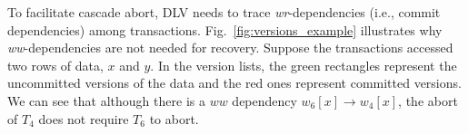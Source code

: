 \documentclass[conference]{IEEEtran}
\begin{document}
To facilitate cascade abort, DLV needs to trace \emph{wr}-dependencies (i.e., commit dependencies) among transactions.
Fig.~\ref{fig:versions_example} illustrates why \emph{ww}-dependencies are not needed for recovery.
Suppose the transactions accessed two rows of data, ${x}$ and ${y}$.
In the version lists, the green rectangles represent the uncommitted versions of the data and the red ones represent committed versions.
We can see that although there is a ${ww}$ dependency ${w_6[x] \rightarrow w_4[x]}$,
the abort of $T_4$ does not require ${T_6}$ to abort.
\begin{figure}[htbp]
  \centering
\end{figure}
\end{document}
